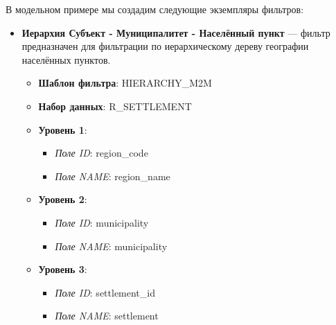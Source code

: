 \documentclass[../user-manual.tex]{subfiles}
\begin{document}
	\begin{modelExample}
		В модельном примере мы создадим следующие экземпляры фильтров:
		
		\begin{itemize}
			\item \textbf{Иерархия Субъект - Муниципалитет - Населённый пункт} --- фильтр предназначен для фильтрации по иерархическому дереву географии населённых пунктов.
			
				\begin{itemize}
					\item \textbf{Шаблон фильтра}: HIERARCHY\_M2M
					\item \textbf{Набор данных}: R\_SETTLEMENT
					\item \textbf{Уровень 1}:
						\begin{itemize}
							\item \textit{Поле ID}: region\_code
							\item \textit{Поле NAME}: region\_name
						\end{itemize}
					\item \textbf{Уровень 2}:
					\begin{itemize}
						\item \textit{Поле ID}: municipality
						\item \textit{Поле NAME}: municipality
					\end{itemize}
					\item \textbf{Уровень 3}:
					\begin{itemize}
						\item \textit{Поле ID}: settlement\_id
						\item \textit{Поле NAME}: settlement
					\end{itemize}
				\end{itemize}
		\end{itemize}
		
	\end{modelExample}
\end{document}
